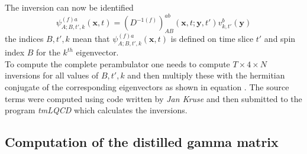     The inversion  can now be identified
    \begin{equation}
        \psi^{(f)a}_{A;B,t',k}(\textbf{x},t) = (D^{-1(f)})^{ab}_{AB}(\textbf{x},t;\textbf{y},t')
            v_{k,t'}^{b}(\textbf{y})
    \end{equation}
    the indices $B,t',k$ mean that $\psi^{(f)a}_{A;B,t',k}(\textbf{x},t)$ is defined on time slice $t'$ and spin index $B$ for the $k^{th}$ eigenvector.\\
    To compute the complete perambulator one needs to compute $T \times 4 \times N$ inversions for all values of $B,t',k$ and then multiply these with the hermitian conjugate of the corresponding eigenvectors as shown in equation . The source terms were computed using code written by \textit{Jan Kruse} \cite{bachelor_thesis_jan} and then submitted to the program \textit{tmLQCD} \cite{jansen_urbach_2009} which calculates the inversions.
    
\subsection{Computation of the distilled gamma matrix}
    